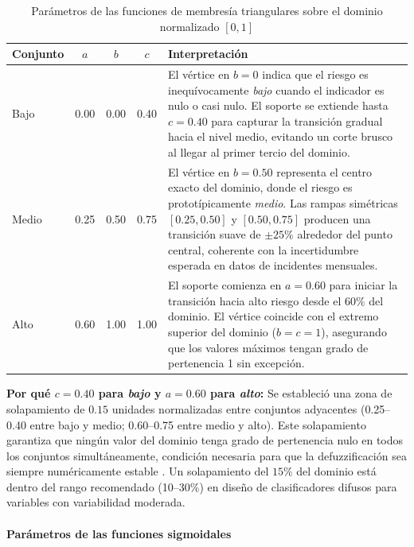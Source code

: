 \documentclass[11pt]{article}
\begin{document}
\begin{table}[H]
    \centering
    \caption{Parámetros de las funciones de membresía triangulares sobre el dominio normalizado $[0,1]$}
    \begin{tabular}{lcccp{6.5cm}}
        \toprule
        \textbf{Conjunto} & $a$ & $b$ & $c$ & \textbf{Interpretación} \\
        \midrule
        Bajo  & 0.00 & 0.00 & 0.40 & El vértice en $b = 0$ indica que el riesgo es inequívocamente \textit{bajo} cuando el indicador es nulo o casi nulo. El soporte se extiende hasta $c = 0.40$ para capturar la transición gradual hacia el nivel medio, evitando un corte brusco al llegar al primer tercio del dominio. \\
        Medio & 0.25 & 0.50 & 0.75 & El vértice en $b = 0.50$ representa el centro exacto del dominio, donde el riesgo es prototípicamente \textit{medio}. Las rampas simétricas $[0.25, 0.50]$ y $[0.50, 0.75]$ producen una transición suave de $\pm 25\%$ alrededor del punto central, coherente con la incertidumbre esperada en datos de incidentes mensuales. \\
        Alto  & 0.60 & 1.00 & 1.00 & El soporte comienza en $a = 0.60$ para iniciar la transición hacia alto riesgo desde el $60\%$ del dominio. El vértice coincide con el extremo superior del dominio ($b = c = 1$), asegurando que los valores máximos tengan grado de pertenencia 1 sin excepción. \\
        \bottomrule
    \end{tabular}
    \label{tab:params-triangular}
    \par{}
\end{table}

\noindent\textbf{Por qué $c = 0.40$ para \textit{bajo} y $a = 0.60$ para \textit{alto}:} Se estableció una zona de solapamiento de $0.15$ unidades normalizadas entre conjuntos adyacentes (0.25--0.40 entre bajo y medio; 0.60--0.75 entre medio y alto). Este solapamiento garantiza que ningún valor del dominio tenga grado de pertenencia nulo en todos los conjuntos simultáneamente, condición necesaria para que la defuzzificación sea siempre numéricamente estable \cite{b7}. Un solapamiento del $15\%$ del dominio está dentro del rango recomendado (10--30\%) en diseño de clasificadores difusos para variables con variabilidad moderada.

\paragraph{Parámetros de las funciones sigmoidales}
\end{document}
